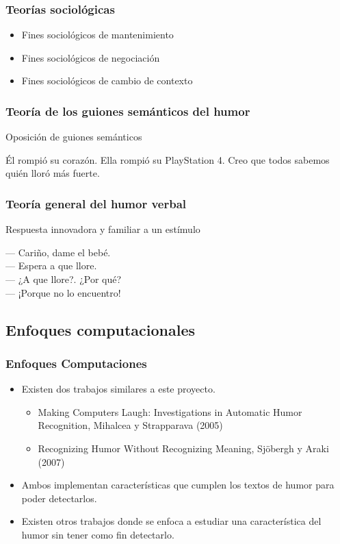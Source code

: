 \begin{frame}
    \frametitle{Teorías sociológicas}

    \begin{itemize}
        \item Fines sociológicos de mantenimiento
        \item Fines sociológicos de negociación
        \item Fines sociológicos de cambio de contexto
    \end{itemize}
\end{frame}

\begin{frame}
    \frametitle{Teoría de los guiones semánticos del humor}

    Oposición de guiones semánticos
    \begin{example}
        Él rompió su corazón. Ella rompió su PlayStation 4. Creo que todos sabemos quién lloró más fuerte.
    \end{example}
\end{frame}

\begin{frame}
    \frametitle{Teoría general del humor verbal}

    Respuesta innovadora y familiar a un estímulo
    \begin{example}
        --- Cariño, dame el bebé. \\
        --- Espera a que llore. \\
        --- ¿A que llore?. ¿Por qué? \\
        --- ¡Porque no lo encuentro! \\
    \end{example}
\end{frame}

\subsection{Enfoques computacionales}
\begin{frame}
    \frametitle{Enfoques Computaciones}

    \begin{itemize}
        \item Existen dos trabajos similares a este proyecto.
        \begin{itemize}
            \item Making Computers Laugh: Investigations in Automatic Humor Recognition, Mihalcea y Strapparava (2005)
            \item Recognizing Humor Without Recognizing Meaning, Sjöbergh y Araki (2007)
        \end{itemize}
        \item Ambos implementan características que cumplen los textos de humor para poder detectarlos.
        \item Existen otros trabajos donde se enfoca a estudiar una característica del humor sin tener como fin detectarlo.
    \end{itemize}
\end{frame}

